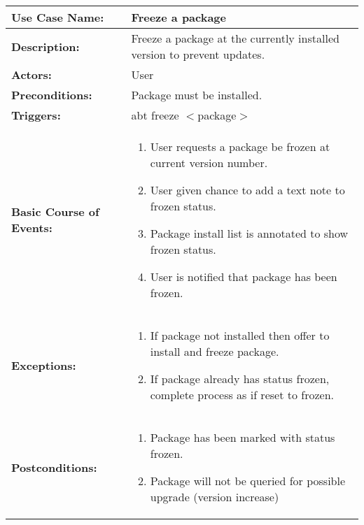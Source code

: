 
\begin{tabularx}{\linewidth}{|l|X|}
\hline
\textbf{Use Case Name:} & \textbf{Freeze a package} \\
\hline
\textbf{Description:} & 
Freeze a package at the currently installed version to prevent updates. \\
\hline
\textbf{Actors:} & User \\
\hline
\textbf{Preconditions:} & Package must be installed. \\
\hline
\textbf{Triggers:} & abt freeze $<$package$>$ \\
\hline
\textbf{Basic Course of Events:} & 
\begin{minipage}{\linewidth} 
  \vspace{0.05em}
  \begin{enumerate}
    \item User requests a package be frozen at current version number.
    \item User given chance to add a text note to frozen status.
    \item Package install list is annotated to show frozen status.
    \item User is notified that package has been frozen.
  \end{enumerate}
  \vspace{0.05em}
\end{minipage}
\\
\hline 
\textbf{Exceptions:} & 
\begin{minipage}{\linewidth} 
  \vspace{0.05em}
  \begin{enumerate}
    \item If package not installed then offer to install and freeze package.
    \item If package already has status frozen, complete process as if reset to frozen.
  \end{enumerate}
  \vspace{0.05em}
\end{minipage}
\\
\hline 
\textbf{Postconditions:} &
\begin{minipage}{\linewidth}
  \vspace{0.05em}
  \begin{enumerate}
    \item Package has been marked with status frozen.
    \item Package will not be queried for possible upgrade (version increase)
  \end{enumerate}
  \vspace{0.05em}
\end{minipage}
\\
\hline
\end{tabularx}


